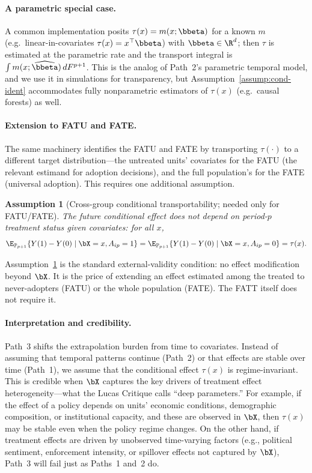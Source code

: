 \documentclass{article}
\newtheorem{assumption}{Assumption}
\renewcommand{\P}{\mathbb{P}}
\begin{document}
\paragraph{A parametric special case.} A common implementation posits $\tau(x) = m(x;\bbeta)$ for a known $m$ (e.g.\ linear-in-covariates $\tau(x) = x^\top\bbeta$) with $\bbeta \in \R^d$; then $\tau$ is estimated at the parametric rate and the transport integral is $\int m(x;\widehat\bbeta)\, dF^{p+1}$. This is the analog of Path~2's parametric temporal model, and we use it in simulations for transparency, but Assumption~\ref{assump:cond-ident} accommodates fully nonparametric estimators of $\tau(x)$ (e.g.\ causal forests) as well.

\paragraph{Extension to FATU and FATE.} The same machinery identifies the FATU and FATE by transporting $\tau(\cdot)$ to a different target distribution---the untreated units' covariates for the FATU (the relevant estimand for adoption decisions), and the full population's for the FATE (universal adoption). This requires one additional assumption.

\begin{assumption}[Cross-group conditional transportability; needed only for FATU/FATE]\label{assump:cross-group}
The future conditional effect does not depend on period-$p$ treatment status given covariates: for all $x$,
\[
\E_{\P_{p+1}}\{Y(1) - Y(0) \mid \bX = x, A_{ip} = 1\} = \E_{\P_{p+1}}\{Y(1) - Y(0) \mid \bX = x, A_{ip} = 0\} = \tau(x).
\]
\end{assumption}

Assumption~\ref{assump:cross-group} is the standard external-validity condition: no effect modification beyond $\bX$. It is the price of extending an effect estimated among the treated to never-adopters (FATU) or the whole population (FATE). The FATT itself does not require it.

\paragraph{Interpretation and credibility.} Path~3 shifts the extrapolation burden from time to covariates. Instead of assuming that temporal patterns continue (Path~2) or that effects are stable over time (Path~1), we assume that the conditional effect $\tau(x)$ is regime-invariant. This is credible when $\bX$ captures the key drivers of treatment effect heterogeneity---what the Lucas Critique calls ``deep parameters.'' For example, if the effect of a policy depends on units' economic conditions, demographic composition, or institutional capacity, and these are observed in $\bX$, then $\tau(x)$ may be stable even when the policy regime changes. On the other hand, if treatment effects are driven by unobserved time-varying factors (e.g., political sentiment, enforcement intensity, or spillover effects not captured by $\bX$), Path~3 will fail just as Paths~1 and~2 do.
\end{document}
